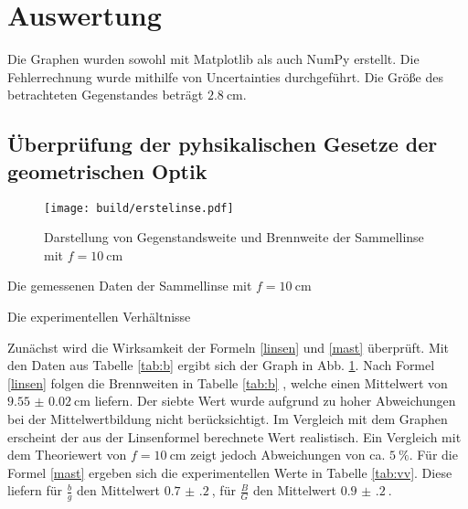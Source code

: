 \section{Auswertung}
\label{sec:Auswertung}


Die Graphen wurden sowohl mit Matplotlib \cite{matplotlib} als auch NumPy \cite{numpy} erstellt. Die
Fehlerrechnung wurde mithilfe von Uncertainties \cite{uncertainties} durchgeführt.
 Die Größe des betrachteten Gegenstandes beträgt $\SI{2.8}{\centi\meter}$.



\subsection{Überprüfung der pyhsikalischen Gesetze der geometrischen Optik}

\begin{figure}
 \centering
 \texttt{[image: build/erstelinse.pdf]}
 \caption{Darstellung von Gegenstandsweite und Brennweite der Sammellinse mit $f = \SI{10}{\centi\meter}$}
 \label{fig:erste}
\end{figure}

\begin{table}
	\centering
	\caption{Die gemessenen Daten der Sammellinse mit $f = \SI{10}{\centi\meter}$}
	
	\label{tab:b}
\end{table}

\begin{table}
	\centering
	\caption{Die experimentellen Verhältnisse}
	
	\label{tab:vv}
\end{table}

Zunächst wird die Wirksamkeit der Formeln \eqref{linsen} und \eqref{mast} überprüft.
Mit den Daten aus Tabelle \ref{tab:b} ergibt sich der Graph in Abb. \ref{fig:erste}. Nach Formel \eqref{linsen} folgen die Brennweiten in Tabelle \ref{tab:b}
, welche einen Mittelwert von $\SI{9.55(2)}{\centi\meter}$ liefern. Der siebte Wert wurde aufgrund zu hoher Abweichungen bei der Mittelwertbildung nicht berücksichtigt. Im Vergleich mit dem Graphen erscheint der aus der Linsenformel berechnete Wert realistisch. Ein Vergleich mit dem Theoriewert von $f = \SI{10}{\centi\meter}$ zeigt jedoch Abweichungen von ca. $\SI{5}{\percent}$.
Für die Formel \eqref{mast} ergeben sich die experimentellen Werte in Tabelle \ref{tab:vv}. Diese liefern für $\frac{b}{g}$ den Mittelwert
$\SI{0.7(2)}{}$, für $\frac{B}{G}$ den Mittelwert $\SI{0.9(2)}{}$.



